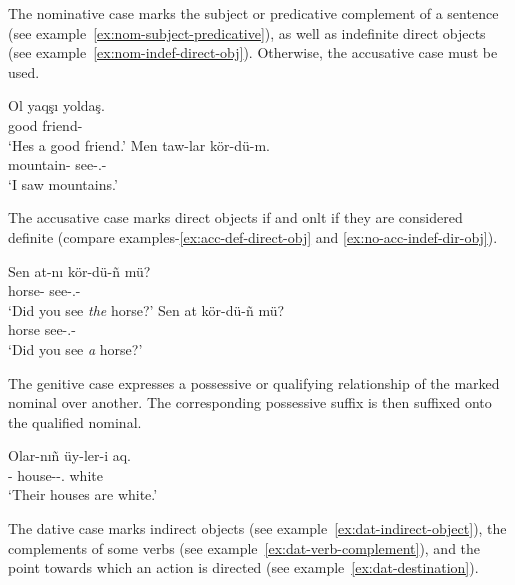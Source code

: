 The nominative case marks the subject or predicative complement of a sentence (see example~\ref{ex:nom-subject-predicative}), as well as indefinite direct objects (see example~\ref{ex:nom-indef-direct-obj}).
Otherwise, the accusative case must be used.

\begin{lingexample}
	\ex \label{ex:nom-subject-predicative} \gll Ol yaqşı yoldaş. \\
		\Tsg{} good friend-\Sg{} \\
		\glt `He\apostrophe{}s a good friend.'
	\ex \label{ex:nom-indef-direct-obj} \gll Men taw-lar kör-dü-m. \\
		\Fsg{} mountain-\Pl{} see-\Pst{}.\Def{}-\Fsg{} \\
		\glt `I saw mountains.'
\end{lingexample}

The accusative case marks direct objects if and onlt if they are considered definite (compare examples-\ref{ex:acc-def-direct-obj} and \ref{ex:no-acc-indef-dir-obj}).

\begin{lingexample}
	\ex \label{ex:acc-def-direct-obj} \gll Sen at-nı kör-dü-ñ mü? \\
		\Ssg{} horse-\Acc{} see-\Pst{}.\Def{}-\Ssg{} \Q{} \\
		\glt `Did you see \emph{the} horse?'
	\ex \label{ex:no-acc-indef-dir-obj} \gll Sen at kör-dü-ñ mü? \\
		\Ssg{} horse see-\Pst{}.\Def{}-\Ssg{} \Q{} \\
		\glt `Did you see \emph{a} horse?'
\end{lingexample}

The genitive case expresses a possessive or qualifying relationship of the marked nominal over another.
The corresponding possessive suffix is then suffixed onto the qualified nominal.

\begin{lingexample}
	\ex \gll Olar-nıñ üy-ler-i aq. \\
		\Tpl{}-\Gen{} house-\Pl{}-\Poss{}.\Third{} white \\
		\glt `Their houses are white.'
\end{lingexample}

The dative case marks indirect objects (see example~\ref{ex:dat-indirect-object}), the complements of some verbs (see example~\ref{ex:dat-verb-complement}), and the point towards which an action is directed (see example~\ref{ex:dat-destination}).

